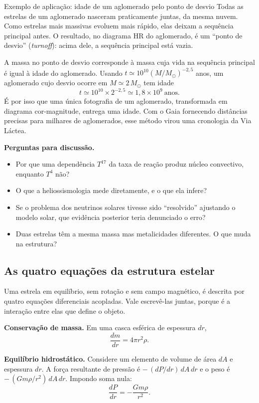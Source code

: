 \documentclass[11pt,a4paper]{article}
\begin{document}
\begin{lessonblock}{Exemplo de aplicação: idade de um aglomerado pelo ponto de desvio}
Todas as estrelas de um aglomerado nasceram praticamente juntas, da mesma nuvem. Como estrelas mais massivas evoluem mais rápido, elas deixam a sequência principal antes. O resultado, no diagrama HR do aglomerado, é um ``ponto de desvio'' (\textit{turnoff}): acima dele, a sequência principal está vazia.

A massa no ponto de desvio corresponde à massa cuja vida na sequência principal é igual à idade do aglomerado. Usando $t\simeq10^{10}(M/M_\odot)^{-2{,}5}$ anos, um aglomerado cujo desvio ocorre em $M\simeq2\,M_\odot$ tem idade
\[
t\simeq10^{10}\times2^{-2{,}5}\simeq1{,}8\times10^{9}\ \text{anos}.
\]
É por isso que uma única fotografia de um aglomerado, transformada em diagrama cor-magnitude, entrega uma idade. Com o Gaia fornecendo distâncias precisas para milhares de aglomerados, esse método virou uma cronologia da Via Láctea.
\end{lessonblock}

\textbf{Perguntas para discussão.}
\begin{itemize}
\item Por que uma dependência $T^{17}$ da taxa de reação produz núcleo convectivo, enquanto $T^{4}$ não?
\item O que a heliossismologia mede diretamente, e o que ela infere?
\item Se o problema dos neutrinos solares tivesse sido ``resolvido'' ajustando o modelo solar, que evidência posterior teria denunciado o erro?
\item Duas estrelas têm a mesma massa mas metalicidades diferentes. O que muda na estrutura?
\end{itemize}

\subsection*{As quatro equações da estrutura estelar}

Uma estrela em equilíbrio, sem rotação e sem campo magnético, é descrita por quatro equações diferenciais acopladas. Vale escrevê-las juntas, porque é a interação entre elas que define o objeto.

\textbf{Conservação de massa.} Em uma casca esférica de espessura $dr$,
\[
\frac{dm}{dr}=4\pi r^{2}\rho.
\]

\textbf{Equilíbrio hidrostático.} Considere um elemento de volume de área $dA$ e espessura $dr$. A força resultante de pressão é $-\,(dP/dr)\,dA\,dr$ e o peso é $-\,(Gm\rho/r^{2})\,dA\,dr$. Impondo soma nula:
\[
\frac{dP}{dr}=-\frac{Gm\rho}{r^{2}}.
\]
\end{document}
